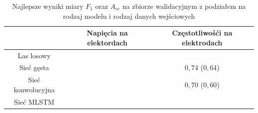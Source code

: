 \documentclass{./assets/wfis}
\begin{document}
\begin{table}[h]
    \centering
    \begin{tabular}{|c|c|c|}
        \hline
                 & Napięcia na elektordach & Częstotliwośći na elektrodach  \\
        \hline
        Las losowy &  &  \\
        Sieć gęsta &  & $0,74$ ($0,64$) \\
        Sieć konwolucyjna & & $0,70$ ($0,60$) \\
        Sieć MLSTM & & \\
        \hline
    \end{tabular}
    \caption{Najlepsze wyniki miary $F_1$ oraz $A_{cc}$ na zbiorze walidacyjnym z podziałem na rodzaj modelu i rodzaj danych wejściowych}
    \label{tab:high-level-results}
\end{table}
\end{document}

